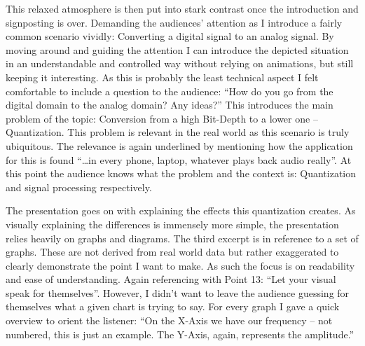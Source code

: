 This relaxed atmosphere is then put into stark contrast once the introduction and signposting is over.
Demanding the audiences' attention as I introduce a fairly common scenario vividly: Converting a digital signal to an analog signal.
By moving around and guiding the attention I can introduce the depicted situation in an understandable and controlled way without relying on animations, but still keeping it interesting.
As this is probably the least technical aspect I felt comfortable to include a question to the audience:
\enquote{How do you go from the digital domain to the analog domain? Any ideas?}
This introduces the main problem of the topic: Conversion from a high Bit-Depth to a lower one -- Quantization.
This problem is relevant in the real world as this scenario is truly ubiquitous.
The relevance is again underlined by mentioning how the application for this is found \enquote{\ldots in every phone, laptop, whatever plays back audio really}.
At this point the audience knows what the problem and the context is: Quantization and signal processing respectively.

The presentation goes on with explaining the effects this quantization creates.
As visually explaining the differences is immensely more simple, the presentation relies heavily on graphs and diagrams.
The third excerpt is in reference to a set of graphs.
These are not derived from real world data but rather exaggerated to clearly demonstrate the point I want to make.
As such the focus is on readability and ease of understanding.
Again referencing \citeauthor{powell2011presenting} with Point 13: \enquote{Let your visual speak for themselves}\autocite[Page 8]{powell2011presenting}.
However, I didn't want to leave the audience guessing for themselves what a given chart is trying to say.
For every graph I gave a quick overview to orient the listener:
\enquote{On the X-Axis we have our frequency -- not numbered, this is just an example. The Y-Axis, again, represents the amplitude.}

